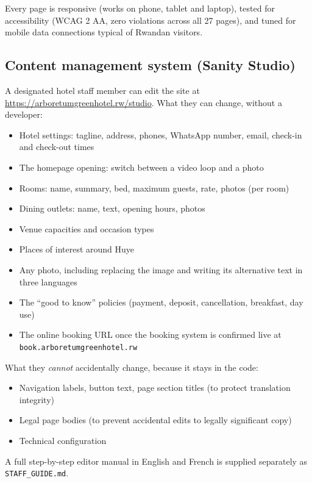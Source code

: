 \documentclass[11pt,a4paper]{article}
\begin{document}
Every page is responsive (works on phone, tablet and laptop), tested for accessibility (WCAG 2 AA, zero violations across all 27 pages), and tuned for mobile data connections typical of Rwandan visitors.

\subsection{Content management system (Sanity Studio)}

A designated hotel staff member can edit the site at \url{https://arboretumgreenhotel.rw/studio}. What they can change, without a developer:

\begin{itemize}
\item Hotel settings: tagline, address, phones, WhatsApp number, email, check-in and check-out times
\item The homepage opening: switch between a video loop and a photo
\item Rooms: name, summary, bed, maximum guests, rate, photos (per room)
\item Dining outlets: name, text, opening hours, photos
\item Venue capacities and occasion types
\item Places of interest around Huye
\item Any photo, including replacing the image and writing its alternative text in three languages
\item The ``good to know'' policies (payment, deposit, cancellation, breakfast, day use)
\item The online booking URL once the booking system is confirmed live at \texttt{book.\allowbreak arboretumgreenhotel.\allowbreak rw}
\end{itemize}

What they \emph{cannot} accidentally change, because it stays in the code:

\begin{itemize}
\item Navigation labels, button text, page section titles (to protect translation integrity)
\item Legal page bodies (to prevent accidental edits to legally significant copy)
\item Technical configuration
\end{itemize}

A full step-by-step editor manual in English and French is supplied separately as \texttt{STAFF\_GUIDE.md}.
\end{document}
